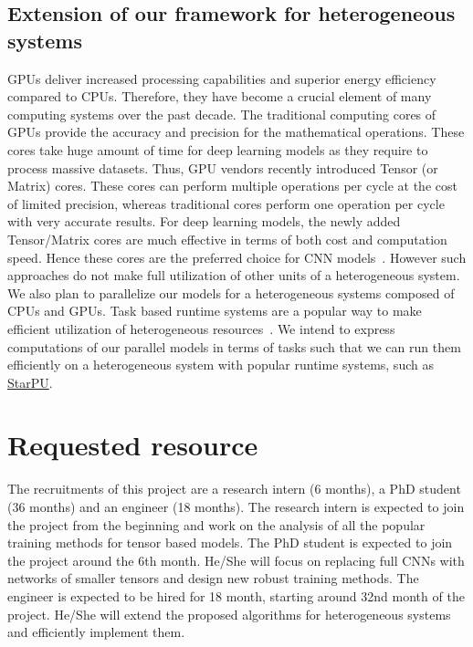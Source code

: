 \documentclass[11pt]{article}
\begin{document}
\subsection{Extension of our framework for heterogeneous systems}
GPUs deliver increased processing capabilities and superior energy efficiency compared to CPUs. Therefore, they have become a crucial element of many computing systems over the past decade. The traditional computing cores of GPUs provide the accuracy and precision for the mathematical operations. These cores take huge amount of time for deep learning models as they require to process massive datasets. Thus, GPU vendors recently introduced Tensor (or Matrix) cores. These cores can perform multiple operations per cycle at the cost of limited precision, whereas traditional cores perform one operation per cycle with very accurate results. For deep learning models, the newly added Tensor/Matrix cores are much effective in terms of both cost and computation speed. Hence these cores are the preferred choice for CNN models~\cite{KSH-Resnet-2017}. However such approaches do not make full utilization of other units of a heterogeneous system. We also plan to parallelize our models for a heterogeneous systems composed of CPUs and GPUs. Task based runtime systems are a popular way to make efficient utilization of heterogeneous resources~\cite{ATNW-Euro-Par-2009}. We intend to express computations of our parallel models in terms of tasks such that we can run them efficiently on a heterogeneous system with popular runtime systems, such as \href{https://starpu.gitlabpages.inria.fr}{StarPU}.



\section{Requested resource}
The recruitments of this project are a research intern (6 months), a PhD student  (36 months) and an engineer (18 months). The  research intern is expected to join the project from the beginning and work on the analysis of all the popular training methods for tensor based models. The PhD student is expected to join the project around the 6th month. He/She will focus on replacing full CNNs  with networks of smaller tensors and design new robust training methods. The engineer is expected to be hired for 18 month, starting around 32nd month of the project. He/She will extend the proposed algorithms for heterogeneous systems and efficiently implement them. 
\end{document}
